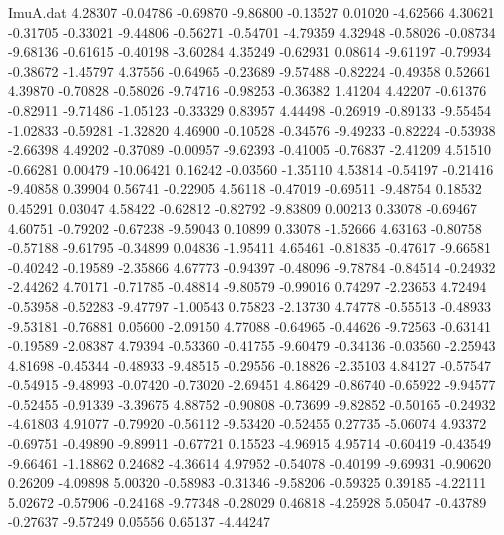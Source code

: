 \begin{filecontents}{ImuA.dat}
   4.28307   -0.04786   -0.69870   -9.86800   -0.13527    0.01020   -4.62566
   4.30621   -0.31705   -0.33021   -9.44806   -0.56271   -0.54701   -4.79359
   4.32948   -0.58026   -0.08734   -9.68136   -0.61615   -0.40198   -3.60284
   4.35249   -0.62931    0.08614   -9.61197   -0.79934   -0.38672   -1.45797
   4.37556   -0.64965   -0.23689   -9.57488   -0.82224   -0.49358    0.52661
   4.39870   -0.70828   -0.58026   -9.74716   -0.98253   -0.36382    1.41204
   4.42207   -0.61376   -0.82911   -9.71486   -1.05123   -0.33329    0.83957
   4.44498   -0.26919   -0.89133   -9.55454   -1.02833   -0.59281   -1.32820
   4.46900   -0.10528   -0.34576   -9.49233   -0.82224   -0.53938   -2.66398
   4.49202   -0.37089   -0.00957   -9.62393   -0.41005   -0.76837   -2.41209
   4.51510   -0.66281    0.00479  -10.06421    0.16242   -0.03560   -1.35110
   4.53814   -0.54197   -0.21416   -9.40858    0.39904    0.56741   -0.22905
   4.56118   -0.47019   -0.69511   -9.48754    0.18532    0.45291    0.03047
   4.58422   -0.62812   -0.82792   -9.83809    0.00213    0.33078   -0.69467
   4.60751   -0.79202   -0.67238   -9.59043    0.10899    0.33078   -1.52666
   4.63163   -0.80758   -0.57188   -9.61795   -0.34899    0.04836   -1.95411
   4.65461   -0.81835   -0.47617   -9.66581   -0.40242   -0.19589   -2.35866
   4.67773   -0.94397   -0.48096   -9.78784   -0.84514   -0.24932   -2.44262
   4.70171   -0.71785   -0.48814   -9.80579   -0.99016    0.74297   -2.23653
   4.72494   -0.53958   -0.52283   -9.47797   -1.00543    0.75823   -2.13730
   4.74778   -0.55513   -0.48933   -9.53181   -0.76881    0.05600   -2.09150
   4.77088   -0.64965   -0.44626   -9.72563   -0.63141   -0.19589   -2.08387
   4.79394   -0.53360   -0.41755   -9.60479   -0.34136   -0.03560   -2.25943
   4.81698   -0.45344   -0.48933   -9.48515   -0.29556   -0.18826   -2.35103
   4.84127   -0.57547   -0.54915   -9.48993   -0.07420   -0.73020   -2.69451
   4.86429   -0.86740   -0.65922   -9.94577   -0.52455   -0.91339   -3.39675
   4.88752   -0.90808   -0.73699   -9.82852   -0.50165   -0.24932   -4.61803
   4.91077   -0.79920   -0.56112   -9.53420   -0.52455    0.27735   -5.06074
   4.93372   -0.69751   -0.49890   -9.89911   -0.67721    0.15523   -4.96915
   4.95714   -0.60419   -0.43549   -9.66461   -1.18862    0.24682   -4.36614
   4.97952   -0.54078   -0.40199   -9.69931   -0.90620    0.26209   -4.09898
   5.00320   -0.58983   -0.31346   -9.58206   -0.59325    0.39185   -4.22111
   5.02672   -0.57906   -0.24168   -9.77348   -0.28029    0.46818   -4.25928
   5.05047   -0.43789   -0.27637   -9.57249    0.05556    0.65137   -4.44247

\end{filecontents}
